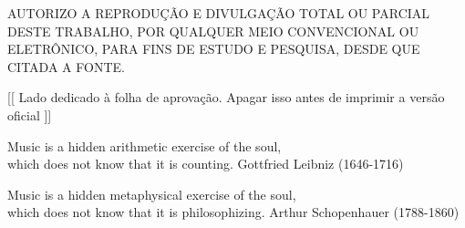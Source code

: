 \capa


\folhaderosto
% 
\pretextualchapter{}
	\thispagestyle{plain}
	\noindent \parbox{5.7in}{\centering AUTORIZO A REPRODUÇÃO E DIVULGAÇÃO TOTAL OU PARCIAL DESTE TRABALHO, POR QUALQUER MEIO CONVENCIONAL OU ELETRÔNICO, PARA FINS DE ESTUDO E PESQUISA, DESDE QUE CITADA A FONTE.}

\pretextualchapter{}
[[	Lado dedicado à folha de aprovação. Apagar isso antes de imprimir a versão oficial ]]



\afterpage{\blankpage}


\afterpage{\blankpage}




\pretextualchapter{}
	\begin{epigrafetop}
		{Music is a hidden arithmetic exercise of the soul, \\ which does not know that it is counting.}
        {Gottfried Leibniz (1646-1716)}
	\end{epigrafetop}



	\begin{epigrafemid}
		{Music is a hidden metaphysical exercise of the soul, \\ which does not know that it is philosophizing.} %
		{Arthur Schopenhauer (1788-1860)} %
	\end{epigrafemid}
	\vspace{-1cm}


